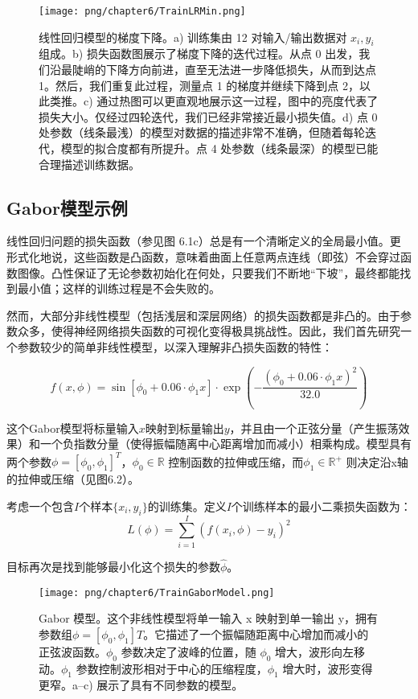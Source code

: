 \begin{figure}[ht!]
	\centering
	\texttt{[image: png/chapter6/TrainLRMin.png]}
	\caption{线性回归模型的梯度下降。a) 训练集由 12 对输入/输出数据对 \({x_i , y_i}\) 组成。b) 损失函数图展示了梯度下降的迭代过程。从点 0 出发，我们沿最陡峭的下降方向前进，直至无法进一步降低损失，从而到达点 1。然后，我们重复此过程，测量点 1 的梯度并继续下降到点 2，以此类推。c) 通过热图可以更直观地展示这一过程，图中的亮度代表了损失大小。仅经过四轮迭代，我们已经非常接近最小损失值。d) 点 0 处参数（线条最浅）的模型对数据的描述非常不准确，但随着每轮迭代，模型的拟合度都有所提升。点 4 处参数（线条最深）的模型已能合理描述训练数据。}
	\end{figure}

\subsection{Gabor模型示例}
线性回归问题的损失函数（参见图 6.1c）总是有一个清晰定义的全局最小值。更形式化地说，这些函数是凸函数，意味着曲面上任意两点连线（即弦）不会穿过函数图像。凸性保证了无论参数初始化在何处，只要我们不断地“下坡”，最终都能找到最小值；这样的训练过程是不会失败的。

然而，大部分非线性模型（包括浅层和深层网络）的损失函数都是非凸的。由于参数众多，使得神经网络损失函数的可视化变得极具挑战性。因此，我们首先研究一个参数较少的简单非线性模型，以深入理解非凸损失函数的特性：

\begin{equation}
f(x, \phi) = \sin[\phi_0 + 0.06 \cdot \phi_1x] \cdot \exp \left( - \frac{(\phi_0 + 0.06 \cdot \phi_1x)^2}{32.0} \right) 
\end{equation}

这个Gabor模型将标量输入\(x\)映射到标量输出\(y\)，并且由一个正弦分量（产生振荡效果）和一个负指数分量（使得振幅随离中心距离增加而减小）相乘构成。模型具有两个参数\(\phi = [\phi_0, \phi_1]^T\)，\(\phi_0 \in \mathbb{R}\) 控制函数的拉伸或压缩，而\(\phi_1 \in \mathbb{R}^+\) 则决定沿x轴的拉伸或压缩（见图6.2）。

考虑一个包含\(I\)个样本\(\{x_i, y_i\}\)的训练集。定义\(I\)个训练样本的最小二乘损失函数为：
\begin{equation}
L(\phi) = \sum_{i=1}^I (f(x_i, \phi) - y_i)^2 
\end{equation}

目标再次是找到能够最小化这个损失的参数\(\hat{\phi}\)。

\begin{figure}[ht!]
\centering
\texttt{[image: png/chapter6/TrainGaborModel.png]}
\caption{Gabor 模型。这个非线性模型将单一输入 x 映射到单一输出 y，拥有参数组\(\phi= [\phi_0 , \phi_1]T\)。它描述了一个振幅随距离中心增加而减小的正弦波函数。\(\phi_0\) 参数决定了波峰的位置，随 \(\phi_0\) 增大，波形向左移动。\(\phi_1\) 参数控制波形相对于中心的压缩程度，\(\phi_1\) 增大时，波形变得更窄。a–c) 展示了具有不同参数的模型。}
\end{figure}
	
